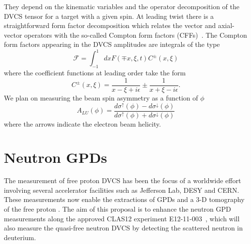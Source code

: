 They depend on the kinematic variables and the operator decomposition of the 
DVCS tensor for a target with a given spin. At leading twist there is a 
straightforward form factor decomposition which relates the vector and 
axial-vector operators with the so-called Compton form factors 
(CFFs)~\cite{Belitsky:2000gz}. The Compton form factors appearing in the DVCS 
amplitudes are integrals of the type
%
%
\begin{equation}
   \mathcal{F} = \int_{-1}^{1} dx F(\mp x,\xi,t) C^{\pm}(x,\xi)
\end{equation}
where the coefficient functions at leading order take the form
\begin{equation}
   C^{\pm}(x,\xi) = \frac{1}{x-\xi + i\epsilon} \pm \frac{1}{x+\xi - 
   i\epsilon}.
\end{equation}
%
We plan on measuring the beam spin asymmetry as a function of $\phi$
\begin{equation}
   A_{LU}(\phi) = \frac{d\sigma^{\uparrow}(\phi) - 
   d\sigma^{\downarrow}(\phi)}{d\sigma^{\uparrow}(\phi) + 
   d\sigma^{\downarrow}(\phi)}
\end{equation}
%
where the arrows indicate the electron beam helicity. 

\section{Neutron GPDs}
The measurement of free proton DVCS has been the focus of a worldwide effort 
\cite{PhysRevLett.87.182002,
   PhysRevLett.87.182001,
   PhysRevD.75.011103,
   Girod:2007aa,
   PhysRevC.92.055202,
   PhysRevLett.99.242501,
   PhysRevC.80.035206,
   PhysRevLett.114.032001,
   Jo:2015ema}
involving several accelerator facilities such as Jefferson Lab, DESY and  
CERN. These measurements now enable the extractions of GPDs and a 3-D 
tomography of the free proton \cite{Guidal:2013rya, PhysRevD.95.011501}. The 
aim of this proposal is to enhance the neutron GPD measurements along the 
approved CLAS12 experiment E12-11-003~\cite{neutronDVCS}, which will also 
measure the quasi-free neutron DVCS by detecting the scattered neutron in 
deuterium.  

